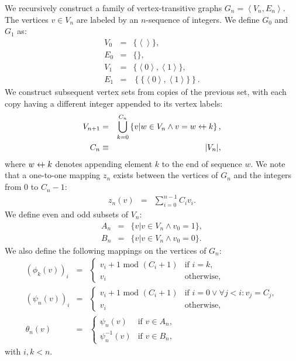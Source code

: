 \documentclass{article}
\newcommand{\la}{\left\langle}
\newcommand{\ra}{\right\rangle}
\newcommand{\beq}{\begin{eqnarray}}
\newcommand{\eeq}{\end{eqnarray}}
\newcommand{\append}{\leftarrow{\mkern-18mu}{+}\:}
\begin{document}
We recursively construct a family of vertex-transitive graphs
$G_n = \la V_n, E_n \ra$.
The vertices $v \in V_n$ are labeled by an $n$-sequence of integers.
We define $G_0$ and $G_1$ as:
\beq
V_0 &=& \{ \la\ra \}, \\
E_0 &=& \{ \}, \\
V_1 &=& \{\la{0}\ra,\la{1}\ra\}, \\
E_1 &=& \left\{\{\la{0}\ra,\la{1}\ra\}\right\}.
\eeq
We construct subsequent vertex sets from copies of the previous set,
with each copy having a different integer appended to its vertex labels:
\beq
\label{eq:vn}
V_{n+1} &=& \bigcup_{k = 0}^{C_n}
\left\{ v | w \in V_n \land v = w \append k \right\},
\\
C_n &\equiv& |V_n|,
\eeq
where $w \append k$ denotes appending element $k$ to the end of sequence $w$.
We note that a one-to-one mapping $z_n$ exists between the vertices of $G_n$ and the
integers from $0$ to $C_n - 1$:
\beq
z_n(v) &=& \sum_{i=0}^{n-1} C_i v_i.
\eeq
We define even and odd subsets of $V_n$:
\beq
A_n &=& \{ v | v \in V_n \land v_0 = 1 \}, \\
B_n &=& \{ v | v \in V_n \land v_0 = 0 \}.
\eeq
We also define the following mappings on the vertices of $G_n$:
\beq
(\phi_k(v))_i
&=&
\begin{cases}
v_i + 1 \mbox{ mod } (C_i + 1) & \mbox{if } i = k,
\\
v_i & \mbox{otherwise},
\end{cases}
\\
(\psi_n(v))_i
&=&
\begin{cases}
v_i + 1 \mbox{ mod } (C_i + 1)
& \mbox{if } i = 0 \lor \forall j < i: v_j = C_j, \\
v_i & \mbox{otherwise},
\end{cases}
\\
\theta_n(v)
&=&
\begin{cases}
\psi_n(v) & \mbox{if } v \in A_n, \\
\psi_n^{-1}(v) & \mbox{if } v \in B_n,
\end{cases}
\eeq
with $i, k < n$.
\end{document}
